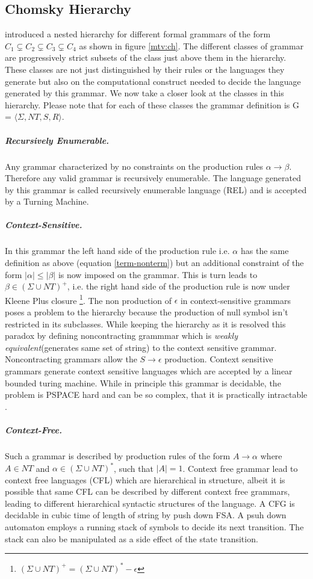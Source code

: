 \subsection{Chomsky Hierarchy}\label{flt:ch}
\cite{Chomsky1956} introduced a nested hierarchy for different formal grammars of the form $C_1 \subsetneq C_2 \subsetneq C_3 \subsetneq C_4$ as shown in figure \ref{mtv:ch}. The different classes of grammar are progressively strict subsets of the class just above them in the hierarchy. These classes are not just distinguished by their rules or the languages they generate but also on the computational construct needed to decide the language generated by this grammar. We now take a closer look at the classes in this hierarchy. Please note that for each of these classes the grammar definition is G = $\langle \Sigma, NT, S, R \rangle$.
\subparagraph{Recursively Enumerable.} Any grammar characterized by no constraints on the production rules $\alpha \rightarrow \beta$. Therefore any valid grammar is recursively enumerable. The language generated by this grammar is called recursively enumerable language (REL) and is accepted by a Turning Machine.
\subparagraph{Context-Sensitive.} In this grammar the left hand side of the production rule i.e. $\alpha$ has the same definition as above (equation \ref{term-nonterm}) but an additional constraint of the form $|\alpha| \leq |\beta|$ is now imposed on the grammar. This is turn leads to $\beta \in (\Sigma \cup NT)^{+}$, i.e. the right hand side of the production rule is now under Kleene Plus closure \footnote{$(\Sigma \cup NT)^{+} = (\Sigma \cup NT)^{*} - \epsilon$}. The non production of $\epsilon$ in context-sensitive grammars poses a problem to the hierarchy because the production of null symbol isn't restricted in its subclasses. While keeping the hierarchy as it is \cite{Chomsky1963} resolved this paradox by defining noncontracting grammmar which is \textit{weakly equivalent}(generates same set of string) to the context sensitive grammar. Noncontracting grammars allow the $S \rightarrow \epsilon$ production. Context sensitive grammars generate context sensitive languages which are accepted by a linear bounded turing machine. While in principle this grammar is decidable, the problem is PSPACE hard and can be so complex, that it is practically intractable \citep{Jager2012}. 
\subparagraph{Context-Free.} Such a grammar is described by production rules of the form $A \rightarrow \alpha$ where $A \in NT$ and $\alpha \in (\Sigma \cup NT)^{*}$, such that $|A|=1$.  Context free grammar lead to context free languages (CFL) which are hierarchical in structure, albeit it is possible that same CFL can be described by different context free grammars, leading to different hierarchical syntactic structures of the language. A CFG is decidable in cubic time of length of string by push down FSA. A psuh down automaton employs a running stack of symbols to decide its next transition. The stack can also be manipulated as a side effect of the state transition.
